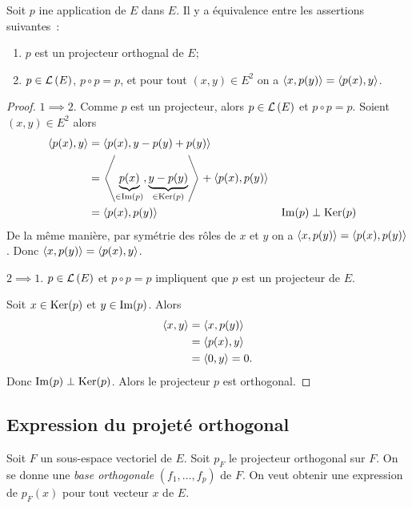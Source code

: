     \begin{theo}
      Soit \(p\) ine application de \(E\) dans \(E\). Il y a équivalence entre les assertions suivantes~:
      \begin{enumerate}
        \item \(p\) est un projecteur orthognal de \(E\);
        \item \(p \in \mathcal{L}\left(E\right)\), \(p \circ p =p\), et pour tout \((x,y) \in E^2\) on a \(\left\langle{x},{p(y)}\right\rangle=\left\langle{p(x)},{y}\right\rangle\).
      \end{enumerate}
    \end{theo}
    \begin{proof}
      \(1 \implies 2\). Comme \(p\) est un projecteur, alors \(p \in \mathcal{L}\left(E\right)\) et \(p \circ p =p\). Soient \((x,y) \in E^2\) alors
      \begin{align}
        \left\langle{p(x)},{y}\right\rangle &=  \left\langle{p(x)},{y-p(y)+p(y)}\right\rangle \\
                           &= \left\langle{\underbrace{p(x)}_{\in \operatorname{Im}(p)}},{\underbrace{y-p(y)}_{\in \operatorname{Ker}(p)}}\right\rangle+\left\langle{p(x)},{p(y)}\right\rangle \\
                           &=  \left\langle{p(x)},{p(y)}\right\rangle && \operatorname{Im}(p) \perp \operatorname{Ker}(p)
      \end{align}
      De la même manière, par symétrie des rôles de \(x\) et \(y\) on a \(\left\langle{x},{p(y)}\right\rangle=\left\langle{p(x)},{p(y)}\right\rangle\). Donc \(\left\langle{x},{p(y)}\right\rangle=\left\langle{p(x)},{y}\right\rangle\).

      \(2 \implies 1\). \(p \in \mathcal{L}\left(E\right)\) et \(p \circ p =p\) impliquent que \(p\) est un projecteur de \(E\).

      Soit \(x \in \operatorname{Ker}(p)\) et \(y \in \operatorname{Im}(p)\). Alors
      \begin{align}
        \left\langle{x},{y}\right\rangle &= \left\langle{x},{p(y)}\right\rangle \\
                        &=\left\langle{p(x)},{y}\right\rangle \\
                        &=\left\langle{0},{y}\right\rangle=0.
      \end{align}
      Donc \(\operatorname{Im}(p) \perp \operatorname{Ker}(p)\). Alors le projecteur \(p\) est orthogonal.
    \end{proof}

    \subsection{Expression du projeté orthogonal}

    Soit \(F\) un sous-espace vectoriel de \(E\). Soit \(p_F\) le projecteur orthogonal sur \(F\). On se donne une \emph{base orthogonale} \((f_1, \ldots, f_p)\) de \(F\). On veut obtenir une expression de \(p_F(x)\) pour tout vecteur \(x\) de \(E\).

